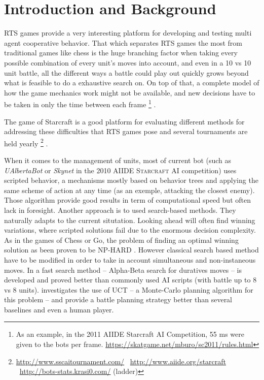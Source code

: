 \section{Introduction and Background}
RTS games provide a very interesting platform for developing and testing multi agent cooperative behavior.
That which separates RTS games the most from traditional games like chess is the huge branching factor when taking every possible combination of every unit's moves into account, and even in a 10 vs 10 unit battle, all the different ways a battle could play out quickly grows beyond what is feasible to do a exhaustive search on.
On top of that, a complete model of how the game mechanics work might not be available, and new decisions have to be taken in only the time between each frame
\footnote{
As an example, in the 2011 AIIDE Starcraft AI Competition, 55 ms were given to the bots per frame.
\url{https://skatgame.net/mburo/sc2011/rules.html}
}
.

The game of Starcraft is a good platform for evaluating different methods for addressing these difficulties that RTS games pose and several tournaments are held yearly
\footnote{
\url{http://www.sscaitournament.com/} \
\url{http://www.aiide.org/starcraft} \
\url{http://bots-stats.krasi0.com/} (ladder)
}
. 


When it comes to the management of units, most of current bot (such as \emph{UAlbertaBot} or \emph{Skynet} in the 2010 AIIDE \textsc{Starcraft} AI competition) uses scripted behavior, a mechanisms mostly based on behavior trees and applying the same scheme of action at any time (as an exemple, attacking the closest enemy). 
Those algorithm provide good results in term of computational speed but often lack in foresight. 
Another approach is to used search-based methods. They naturally adapts to the current situtation. Looking ahead will often find winning variations, where scripted solutions fail due to the enormous decision complexity. 
As in the games of Chess or Go, the problem of finding an optimal winning solution as been proven to be NP-HARD \cite{nphard}. 
However classical search based method have to be modified in order to take in account simultaneous and non-instaneous moves.
In \cite{abcd} a fast search method -- Alpha-Beta search for duratives moves -- is developed and proved better than commonly used AI scripts (with battle up to 8 vs 8 units). 
\cite{wargusuct} investigates the use of UCT -- a Monte-Carlo planning algorithm for this problem -- and provide a battle planning strategy better than several baselines and even a human player.

